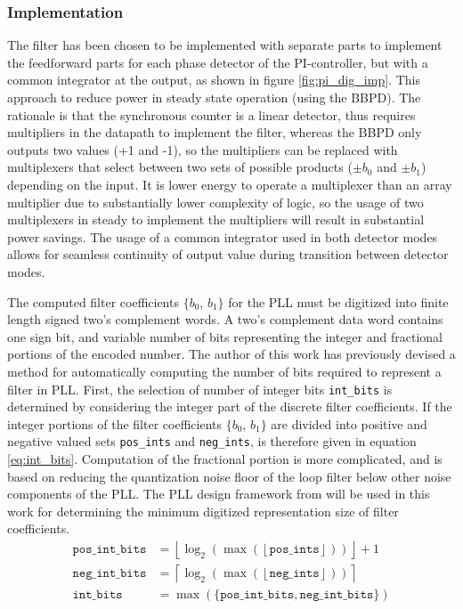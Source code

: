 



		\subsubsection{Implementation}
			The filter has been chosen to be implemented with separate parts to implement the feedforward parts for each phase detector of the PI-controller, but with a common integrator at the output, as shown in figure \ref{fig:pi_dig_imp}. This approach to reduce power in steady state operation (using the BBPD). The rationale is that the synchronous counter is a linear detector, thus requires multipliers in the datapath to implement the filter, whereas the BBPD only outputs two values (+1 and -1), so the multipliers can be replaced with multiplexers that select between two sets of possible products ($\pm b_0$ and $\pm b_1$) depending on the input. It is lower energy to operate a multiplexer than an array multiplier due to substantially lower complexity of logic, so the usage of two multiplexers in steady to implement the multipliers will result in substantial power savings. The usage of a common integrator used in both detector modes allows for seamless continuity of output value during transition between detector modes. 

			The computed filter coefficients $\{b_0$, $b_1\}$ for the PLL must be digitized into finite length signed two's complement words. A two's complement data word contains one sign bit, and variable number of bits representing the integer and fractional portions of the encoded number. The author of this work has previously devised a method \cite{Me} for automatically computing the number of bits required to represent a filter in PLL. First, the selection of number of integer bits \texttt{int\_bits} is determined by considering the integer part of the discrete filter coefficients. If the integer portions of the filter coefficients $\{b_0$, $b_1\}$ are divided into positive and negative valued sets \texttt{pos\_ints} and \texttt{neg\_ints}, is therefore given in equation \ref{eq:int_bits}. Computation of the fractional portion is more complicated, and is based on reducing the quantization noise floor of the loop filter below other noise components of the PLL. The PLL design framework from \cite{Me} will be used in this work for determining the minimum digitized representation size of filter coefficients.
			\begin{align}
				\mathtt{pos\_int\_bits} &= \left\lfloor \log_2\left(\max\left(\left\lfloor \mathtt{pos\_ints} \right\rfloor\right)\right) \right\rfloor +1\\
				\mathtt{neg\_int\_bits} &= \left\lceil \log_2\left(\max\left(\left\lfloor \mathtt{neg\_ints} \right\rfloor\right)\right) \right\rceil\\
				\mathtt{int\_bits} &= \max(\mathtt{\{pos\_int\_bits}, \mathtt{neg\_int\_bits}\})\label{eq:int_bits}
			\end{align}


